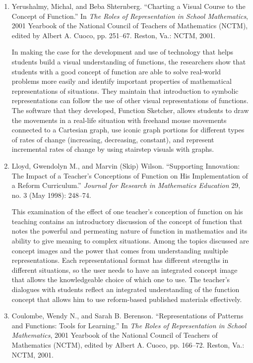 \documentclass[
  10pt,
  a4paper,
  landscape,
  twoside,
  openany
]{scrbook}
\newcommand{\EN}[1]{#1}
\begin{document}
\TriPara
{
\EN{
  \begin{enumerate}
    \item Yerushalmy, Michal, and Beba Shternberg. ``Charting a Visual Course to the Concept of Function.'' In \emph{The Roles of Representation in School Mathematics}, 2001 Yearbook of the National Council of Teachers of Mathematics (NCTM), edited by Albert A. Cuoco, pp. 251--67. Reston, Va.: NCTM, 2001.

      In making the case for the development and use of technology that helps students build a visual understanding of functions, the researchers show that students with a good concept of function are able to solve real-world problems more easily and identify important properties of mathematical representations of situations. They maintain that introduction to symbolic representations can follow the use of other visual representations of functions. The software that they developed, Function Sketcher, allows students to draw the movements in a real-life situation with freehand mouse movements connected to a Cartesian graph, use iconic graph portions for different types of rates of change (increasing, decreasing, constant), and represent incremental rates of change by using stairstep visuals with graphs.

    \item Lloyd, Gwendolyn M., and Marvin (Skip) Wilson. ``Supporting Innovation: The Impact of a Teacher's Conceptions of Function on His Implementation of a Reform Curriculum.'' \emph{Journal for Research in Mathematics Education} 29, no. 3 (May 1998): 248--74.

      This examination of the effect of one teacher's conception of function on his teaching contains an introductory discussion of the concept of function that notes the powerful and permeating nature of function in mathematics and its ability to give meaning to complex situations. Among the topics discussed are concept images and the power that comes from understanding multiple representations. Each representational format has different strengths in different situations, so the user needs to have an integrated concept image that allows the knowledgeable choice of which one to use. The teacher's dialogues with students reflect an integrated understanding of the function concept that allows him to use reform-based published materials effectively.

    \item Coulombe, Wendy N., and Sarah B. Berenson. ``Representations of Patterns and Functions: Tools for Learning.'' In \emph{The Roles of Representation in School Mathematics}, 2001 Yearbook of the National Council of Teachers of Mathematics (NCTM), edited by Albert A. Cuoco, pp. 166--72. Reston, Va.: NCTM, 2001.


\end{enumerate}}}
\end{document}
